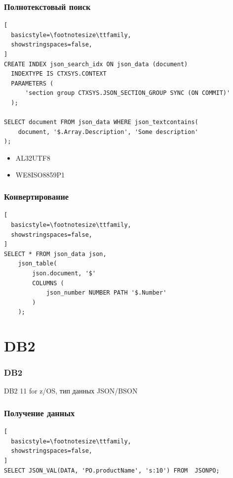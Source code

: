 \documentclass[14pt, compress, aspectratio=169]{beamer}
\begin{document}
\begin{frame}[fragile]
  \frametitle{Полнотекстовый поиск}

\vspace{-20pt}
\begin{lstlisting}[
  basicstyle=\footnotesize\ttfamily,
  showstringspaces=false,
]
CREATE INDEX json_search_idx ON json_data (document)
  INDEXTYPE IS CTXSYS.CONTEXT
  PARAMETERS (
      'section group CTXSYS.JSON_SECTION_GROUP SYNC (ON COMMIT)'
  );

SELECT document FROM json_data WHERE json_textcontains(
    document, '$.Array.Description', 'Some description'
);

\end{lstlisting}

\begin{itemize}[label={\MVRightarrow}]
    \item AL32UTF8
    \item WE8ISO8859P1
\end{itemize}

\end{frame}

\begin{frame}[fragile]
  \frametitle{Конвертирование}

  \vspace{-20pt}
\begin{lstlisting}[
  basicstyle=\footnotesize\ttfamily,
  showstringspaces=false,
]
SELECT * FROM json_data json,
    json_table(
        json.document, '$'
        COLUMNS (
            json_number NUMBER PATH '$.Number'
        )
    );
\end{lstlisting}

\end{frame}

\section{DB2}

\begin{frame}[fragile]
    \frametitle{DB2}

    DB2 11 for z/OS, тип данных JSON/BSON
\end{frame}

\begin{frame}[fragile]
  \frametitle{Получение данных}

  \vspace{-20pt}
\begin{lstlisting}[
  basicstyle=\footnotesize\ttfamily,
  showstringspaces=false,
]
SELECT JSON_VAL(DATA, 'PO.productName', 's:10') FROM  JSONPO;
\end{lstlisting}

\end{frame}
\end{document}

